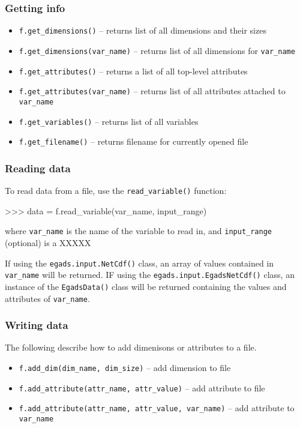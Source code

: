 \documentclass[a4paper,11pt]{report}
\begin{document}
\subsubsection{Getting info}

\begin{itemize}
\item \verb|f.get_dimensions()| -- returns list of all dimensions and their sizes
\item \verb|f.get_dimensions(var_name)| -- returns list of all dimensions for \verb|var_name|
\item \verb|f.get_attributes()| -- returns a list of all top-level attributes
\item \verb|f.get_attributes(var_name)| -- returns list of all attributes attached to \verb|var_name|
\item \verb|f.get_variables()| -- returns list of all variables
\item \verb|f.get_filename()| -- returns filename for currently opened file
\end{itemize}

\subsubsection{Reading data}

To read data from a file, use the \verb|read_variable()| function:

\begin{command}
    >>> data = f.read_variable(var_name, input_range)
\end{command}
where \verb|var_name| is the name of the variable to read in, and \verb|input_range| (optional) is a XXXXX

If using the \verb|egads.input.NetCdf()| class, an array of values contained in \verb|var_name| will be returned. IF using the \verb|egads.input.EgadsNetCdf()| class, an instance of the \verb|EgadsData()| class will be returned containing the values and attributes of \verb|var_name|.

\subsubsection{Writing data}

The following describe how to add dimenisons or attributes to a file.
\begin{itemize}
\item \verb|f.add_dim(dim_name, dim_size)| -- add dimension to file
\item \verb|f.add_attribute(attr_name, attr_value)| -- add attribute to file
\item \verb|f.add_attribute(attr_name, attr_value, var_name)| -- add attribute to \verb|var_name|
\end{itemize}
\end{document}

